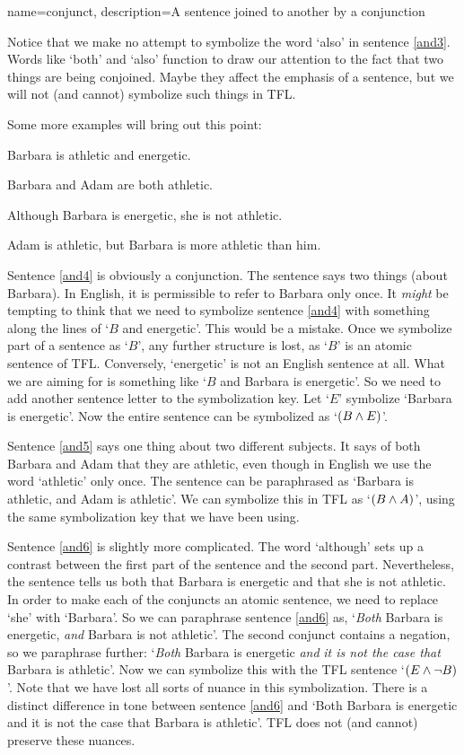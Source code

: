 {
name=conjunct,
description={A sentence joined to another by a \gls{conjunction}}
}


Notice that we make no attempt to symbolize the word `also' in sentence \ref{and3}. Words like `both' and `also' function to draw our attention to the fact that two things are being conjoined. Maybe they affect the emphasis of a sentence, but we will not (and cannot) symbolize such things in TFL.

Some more examples will bring out this point:
	\begin{earg}
		\item[\ex{and4}]Barbara is athletic and energetic.
		\item[\ex{and5}]Barbara and Adam are both athletic.
		\item[\ex{and6}]Although Barbara is energetic, she is not athletic.
	\item[\ex{and7}]Adam is athletic, but Barbara is more athletic than him.
	\end{earg}
Sentence \ref{and4} is obviously a conjunction. The sentence says two things (about Barbara). In English, it is permissible to refer to Barbara only once. It \emph{might} be tempting to think that we need to symbolize sentence \ref{and4} with something along the lines of `$B$ and energetic'. This would be a mistake. Once we symbolize part of a sentence as `$B$', any further structure is lost, as `$B$' is an atomic sentence of TFL. Conversely, `energetic' is not an English sentence at all. What we are aiming for is something like `$B$ and Barbara is energetic'. So we need to add another sentence letter to the symbolization key. Let `$E$' symbolize `Barbara is energetic'. Now the entire sentence can be symbolized as `$(B\wedge E)$'.

Sentence \ref{and5} says one thing about two different subjects. It says of both Barbara and Adam that they are athletic, even though in English we use the word `athletic' only once. The sentence can be paraphrased as `Barbara is athletic, and Adam is athletic'. We can symbolize this in TFL as `$(B\wedge A)$', using the same symbolization key that we have been using.

Sentence \ref{and6} is slightly more complicated. The word `although' sets up a contrast between the first part of the sentence and the second part. Nevertheless, the sentence tells us both that Barbara is energetic and that she is not athletic. In order to make each of the conjuncts an atomic sentence, we need to replace `she' with `Barbara'. So we can paraphrase sentence \ref{and6} as, `\emph{Both} Barbara is energetic, \emph{and} Barbara is not athletic'. The second conjunct contains a negation, so we paraphrase further: `\emph{Both} Barbara is energetic \emph{and} \emph{it is not the case that} Barbara is athletic'. Now we can symbolize this with the TFL sentence `$(E\wedge\neg B)$'. Note that we have lost all sorts of nuance in this symbolization. There is a distinct difference in tone between sentence \ref{and6} and `Both Barbara is energetic and it is not the case that Barbara is athletic'. TFL does not (and cannot) preserve these nuances.

